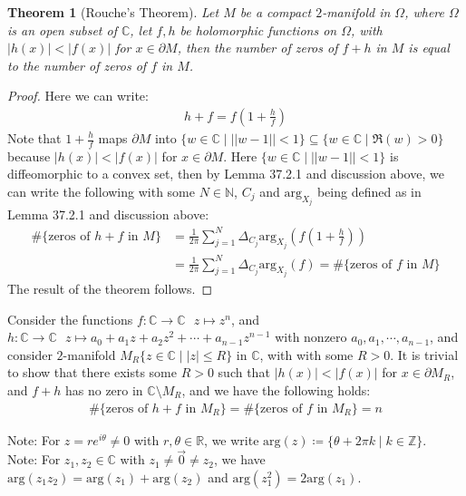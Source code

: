 \documentclass[11pt,oneside]{book}
\theoremstyle{break}
\theoremstyle{break}
\newtheorem{thm}{Theorem}[section]
\newcommand{\R}{\mathbb{R}}
\newcommand{\N}{\mathbb{N}}
\newcommand{\Z}{\mathbb{Z}}
\newcommand{\Complex}{\mathbb{C}}
\newcommand{\note}{\color{red}Note: \color{black}}
\begin{document}
\begin{thm}[Rouche's Theorem]
Let $M$ be a compact $2$-manifold in $\Omega$, where $\Omega$ is an open subset of $\Complex$, let $f, h$ be holomorphic functions on $\Omega$, with $|h(x)|< |f(x)|$ for $x\in\partial M$, then the number of zeros of $f+h$ in $M$ is equal to the number of zeros of $f$ in $M$.  
\end{thm}
\begin{proof}
Here we can write:
\begin{align*}
h + f = f\left( 1 + \frac{h}{f}\right)
\end{align*}
Note that $1+\frac{h}{f}$ maps $\partial M$ into $\{w \in \Complex \mid ||w - 1 || <1\}\subseteq \{ w \in \Complex \mid \Re(w) >0\}$ because $|h(x)|<|f(x)|$ for $x \in \partial M$. Here $\{w \in \Complex \mid ||w - 1 || <1\}$ is diffeomorphic to a convex set, then by Lemma 37.2.1 and discussion above, we can write the following with some $N \in \N$, $C_j$ and $\text{arg}_{X_j}$ being defined as in Lemma 37.2.1 and discussion above:
\begin{align*}
\# \{\text{zeros of }h+f\text{ in }M\} &= \frac{1}{2\pi}\sum_{j=1}^N \Delta_{ C_j}\text{arg}_{X_j}\left( f\left( 1+\frac{h}{f}\right)\right) \\
&= \frac{1}{2\pi} \sum_{j=1}^N \Delta_{C_j}\text{arg}_{X_j}(f) = \# \{\text{zeros of }f\text{ in }M\}
\end{align*}
The result of the theorem follows. 
\end{proof}
\newpage
Consider the functions $f:\Complex \to \Complex \ \ \ z \mapsto z^n$, and $h:\Complex \to \Complex \ \ \ z\mapsto a_0 + a_1 z+ a_2 z^2 + \cdots + a_{n-1}z^{n-1}$ with nonzero $a_0, a_1,\cdots, a_{n-1}$, and consider $2$-manifold $M_R\{ z \in \Complex \mid |z| \leq R\}$ in $\Complex$, with with some $R>0$. It is trivial to show that there exists some $R >0$ such that $|h(x) | < |f(x)| $ for $x \in \partial M_R$, and $f+h$ has no zero in $\Complex \setminus M_R$, and we have the following holds:
\begin{align*}
\# \{\text{zeros of }h+f\text{ in }M_R\} = \# \{\text{zeros of }f\text{ in }M_R\} = n
\end{align*}

\note For $z =re^{i\theta} \neq 0$ with $r,\theta \in \R$, we write $\text{arg}(z) \coloneqq \{\theta + 2\pi k \mid k\in \Z\}$.\\
\note For $z_1,z_2 \in \Complex$ with $z_1\neq \vec{0}\neq z_2$, we have $\text{arg}(z_1z_2) = \text{arg}(z_1) + \text{arg}(z_2)$ and $\text{arg}(z_1^2) = 2\text{arg}(z_1)$. \\
\end{document}
